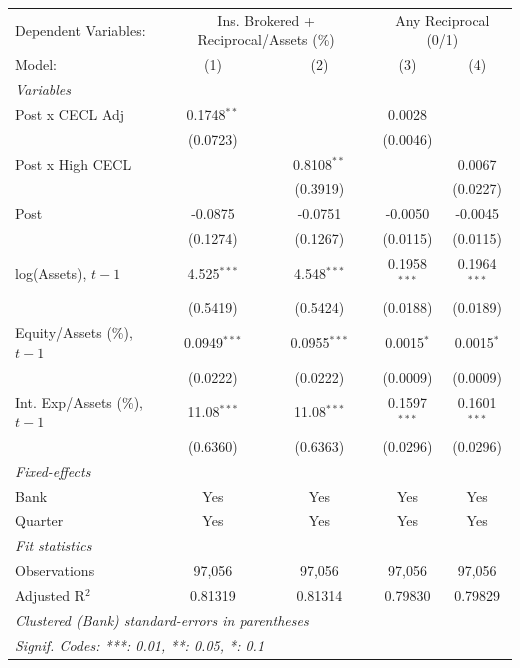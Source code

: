 
\begingroup
\centering
\begin{tabular}{lcccc}
   \tabularnewline \midrule \midrule
   Dependent Variables: & \multicolumn{2}{c}{Ins. Brokered + Reciprocal/Assets (\%)} & \multicolumn{2}{c}{Any Reciprocal (0/1)}\\
   Model:                         & (1)            & (2)            & (3)            & (4)\\  
   \midrule
   \emph{Variables}\\
   Post x CECL Adj                & 0.1748$^{**}$  &                & 0.0028         &   \\   
                                  & (0.0723)       &                & (0.0046)       &   \\   
   Post x High CECL               &                & 0.8108$^{**}$  &                & 0.0067\\   
                                  &                & (0.3919)       &                & (0.0227)\\   
   Post                           & -0.0875        & -0.0751        & -0.0050        & -0.0045\\   
                                  & (0.1274)       & (0.1267)       & (0.0115)       & (0.0115)\\   
   log(Assets), $t{-}1$           & 4.525$^{***}$  & 4.548$^{***}$  & 0.1958$^{***}$ & 0.1964$^{***}$\\   
                                  & (0.5419)       & (0.5424)       & (0.0188)       & (0.0189)\\   
   Equity/Assets (\%), $t{-}1$    & 0.0949$^{***}$ & 0.0955$^{***}$ & 0.0015$^{*}$   & 0.0015$^{*}$\\   
                                  & (0.0222)       & (0.0222)       & (0.0009)       & (0.0009)\\   
   Int. Exp/Assets (\%), $t{-}1$  & 11.08$^{***}$  & 11.08$^{***}$  & 0.1597$^{***}$ & 0.1601$^{***}$\\   
                                  & (0.6360)       & (0.6363)       & (0.0296)       & (0.0296)\\   
   \midrule
   \emph{Fixed-effects}\\
   Bank                           & Yes            & Yes            & Yes            & Yes\\  
   Quarter                        & Yes            & Yes            & Yes            & Yes\\  
   \midrule
   \emph{Fit statistics}\\
   Observations                   & 97,056         & 97,056         & 97,056         & 97,056\\  
   Adjusted R$^2$                 & 0.81319        & 0.81314        & 0.79830        & 0.79829\\  
   \midrule \midrule
   \multicolumn{5}{l}{\emph{Clustered (Bank) standard-errors in parentheses}}\\
   \multicolumn{5}{l}{\emph{Signif. Codes: ***: 0.01, **: 0.05, *: 0.1}}\\
\end{tabular}
\par\endgroup


